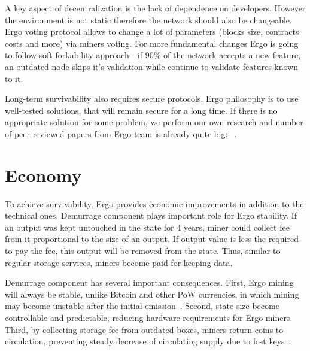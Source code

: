 \documentclass[]{article}
\begin{document}
    A key aspect of decentralization is the lack of dependence on developers.
    However the environment is not static therefore the network should also be changeable.
    Ergo voting protocol allows to change a lot of parameters (blocks size, contracts costs and more) via miners voting.
    For more fundamental changes Ergo is going to follow soft-forkability approach -
    if 90\% of the network accepts a new feature, an outdated node skips it's validation
    while continue to validate features known to it.

    Long-term survivability also requires secure protocols.
    Ergo philosophy is to use well-tested solutions, that will remain secure for a long time.
    If there is no appropriate solution for some problem, we perform our own research and
    number of peer-reviewed papers from Ergo team is already quite big:
    ~\cite{reyzin2017improving,meshkov2017short,chepurnoy2018systematic,chepurnoy2018self,chepurnoy2018checking,duong2018multi}.

    \section{Economy}

    To achieve survivability, Ergo provides economic improvements in addition to the technical ones.
    Demurrage component plays important role for Ergo stability.
    If an output was kept untouched in the state for 4 years, miner could collect fee from it
    proportional to the size of an output.
    If output value is less the required to pay the fee, this output will be removed from the state.
    Thus, similar to regular storage services, miners become paid for keeping data.

    Demurrage component has several important consequences.
    First, Ergo mining will always be stable, unlike Bitcoin and other PoW currencies, in which
    mining may become unstable after the initial emission~\cite{carlsten2016instability}.
    Second, state size become controllable and predictable, reducing hardware requirements
    for Ergo miners.
    Third, by collecting storage fee from outdated boxes, miners return coins to circulation,
    preventing steady decrease of circulating supply due to lost keys~\cite{wsj2018}.
\end{document}
